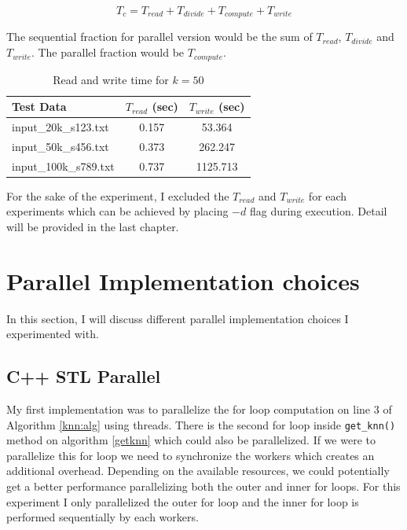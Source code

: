 \documentclass[12pt,a4paper]{report}
\begin{document}
\begin{equation}
T_c = T_{read} + T_{divide} +  T_{compute} + T_{write}
\end{equation}

The sequential fraction for parallel version would be the sum of $T_{read}$, $T_{divide}$ and $T_{write}$. The parallel fraction would be $T_{compute}$.

\begin{table}[htp]
  \begin{center}
    \begin{tabular}{l c c} %
      Test Data & $T_{read}$ (sec) & $T_{write}$ (sec)  \\
      \midrule
      input\_20k\_s123.txt  & 0.157 & 53.364 \\
      input\_50k\_s456.txt  & 0.373 & 262.247 \\
      input\_100k\_s789.txt & 0.737 & 1125.713 \\
      \bottomrule
    \end{tabular}
    \caption{Read and write time for $k=50$}
    \label{readwritetime}
  \end{center}
\end{table}

For the sake of the experiment, I excluded the $T_{read}$ and $T_{write}$ for each experiments which can be achieved by placing $-d$ flag during execution. Detail will be provided in the last chapter.

\chapter{Parallel Implementation choices}
In this section, I will discuss different parallel implementation choices I experimented with.
\section{C++ STL Parallel}
My first implementation was to parallelize the for loop computation on line 3 of Algorithm \ref{knn:alg} using threads. There is the second for loop inside \verb!get_knn()! method on algorithm \ref{getknn} which could also be parallelized. If we were to parallelize this for loop we need to synchronize the workers which creates an additional overhead. Depending on the available resources, we could potentially get a better performance parallelizing both the outer and inner for loops. For this experiment I only parallelized the outer for loop and the inner for loop is performed sequentially by each workers. \\
\end{document}
